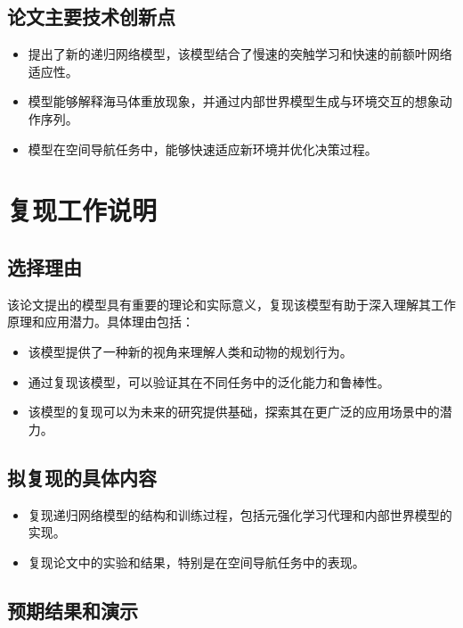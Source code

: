 \documentclass[UTF8,12pt]{article} %
\begin{document}
\subsection{论文主要技术创新点}

\begin{itemize}
    \item 提出了新的递归网络模型，该模型结合了慢速的突触学习和快速的前额叶网络适应性。
    \item 模型能够解释海马体重放现象，并通过内部世界模型生成与环境交互的想象动作序列。
    \item 模型在空间导航任务中，能够快速适应新环境并优化决策过程。
\end{itemize}

\section{复现工作说明}

\subsection{选择理由}

该论文提出的模型具有重要的理论和实际意义，复现该模型有助于深入理解其工作原理和应用潜力。具体理由包括：

\begin{itemize}
    \item 该模型提供了一种新的视角来理解人类和动物的规划行为。
    \item 通过复现该模型，可以验证其在不同任务中的泛化能力和鲁棒性。
    \item 该模型的复现可以为未来的研究提供基础，探索其在更广泛的应用场景中的潜力。
\end{itemize}

\subsection{拟复现的具体内容}

\begin{itemize}
    \item 复现递归网络模型的结构和训练过程，包括元强化学习代理和内部世界模型的实现。
    \item 复现论文中的实验和结果，特别是在空间导航任务中的表现。
\end{itemize}

\subsection{预期结果和演示}
\end{document}
